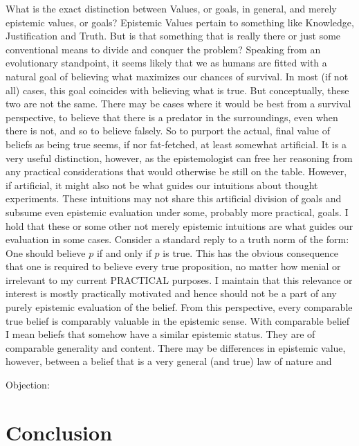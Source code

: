 \documentclass[12pt,numbers=noenddot]{scrartcl}
\begin{document}
What is the exact distinction between Values, or goals, in general, and merely epistemic values, or goals? Epistemic Values pertain to something like Knowledge, Justification and Truth. But is that something that is really there or just some conventional means to divide and conquer the problem? Speaking from an evolutionary standpoint, it seems likely that we as humans are fitted with a natural goal of believing what maximizes our chances of survival. In most (if not all) cases, this goal coincides with believing what is true. But conceptually, these two are not the same. There may be cases where it would be best from a survival perspective, to believe that there is a predator in the surroundings, even when there is not, and so to believe falsely. So to purport the actual, final value of beliefs as being true seems, if nor fat-fetched, at least somewhat artificial. It is a very useful distinction, however, as the epistemologist can free her reasoning from any practical considerations that would otherwise be still on the table. However, if artificial, it might also not be what guides our intuitions about thought experiments. These intuitions may not share this artificial division of goals and subsume even epistemic evaluation under some, probably more practical, goals. I hold that these or some other not merely epistemic intuitions are what guides our evaluation in some cases. Consider a standard reply to a truth norm of the form: One should believe $p$ if and only if $p$ is true. This has the obvious consequence that one is required to believe every true proposition, no matter how menial or irrelevant to my current PRACTICAL purposes. I maintain that this relevance or interest is mostly practically motivated and hence should not be a part of any purely epistemic evaluation of the belief. From this perspective, every comparable true belief is comparably valuable in the epistemic sense. With comparable belief I mean beliefs that somehow have a similar epistemic status. They are of comparable generality and content. There may be differences in epistemic value, however, between a belief that is a very general (and true) law of nature and

Objection: 

\nocite{sep-value-theory,Goldman2002-GOLTUO-2,James1896-JAMTWT-19,James1907-JAMP,Zagzebski2004-ZAGEVM-2,Berker2013-BERETA-2,Berker2013-BERTRO-24,Goldman2015-GOLRVA,Berker2015-BERRTG-2}

\section{Conclusion}

\printbibliography
\end{document}
